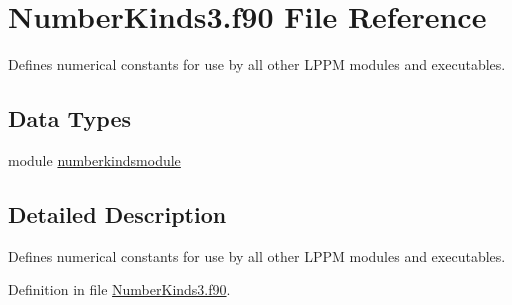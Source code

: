 \hypertarget{NumberKinds3_8f90}{\section{Number\+Kinds3.\+f90 File Reference}
\label{NumberKinds3_8f90}
}


Defines numerical constants for use by all other L\+P\+P\+M modules and executables.  


\subsection*{Data Types}
\begin{DoxyCompactItemize}
\item 
module \hyperlink{classnumberkindsmodule}{numberkindsmodule}
\end{DoxyCompactItemize}


\subsection{Detailed Description}
Defines numerical constants for use by all other L\+P\+P\+M modules and executables. 



Definition in file \hyperlink{NumberKinds3_8f90_source}{Number\+Kinds3.\+f90}.

